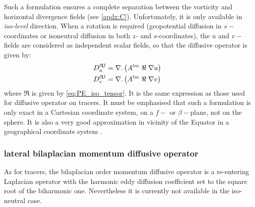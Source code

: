 \documentclass[../main/NEMO_manual]{subfiles}
\begin{document}
Such a formulation ensures a complete separation between the vorticity and horizontal divergence fields
(see \autoref{apdx:C}).
Unfortunately, it is only available in \textit{iso-level} direction.
When a rotation is required
(\ie geopotential diffusion in $s-$coordinates or isoneutral diffusion in both $z$- and $s$-coordinates),
the $u$ and $v-$fields are considered as independent scalar fields, so that the diffusive operator is given by:
\[
  \begin{split}
    D_u^{l{\rm {\bf U}}} &= \nabla .\left( {A^{lm} \;\Re \;\nabla u} \right) \\
    D_v^{l{\rm {\bf U}}} &= \nabla .\left( {A^{lm} \;\Re \;\nabla v} \right)
  \end{split}
\]
where $\Re$ is given by \autoref{eq:PE_iso_tensor}.
It is the same expression as those used for diffusive operator on tracers.
It must be emphasised that such a formulation is only exact in a Cartesian coordinate system,
\ie on a $f-$ or $\beta-$plane, not on the sphere.
It is also a very good approximation in vicinity of the Equator in
a geographical coordinate system \citep{Lengaigne_al_JGR03}.

\subsubsection{lateral bilaplacian momentum diffusive operator}

As for tracers, the bilaplacian order momentum diffusive operator is a re-entering Laplacian operator with
the harmonic eddy diffusion coefficient set to the square root of the biharmonic one.
Nevertheless it is currently not available in the iso-neutral case.

\biblio

\pindex
\end{document}
